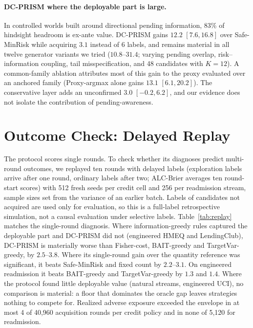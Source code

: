 \documentclass[runningheads]{llncs}
\begin{document}
\paragraph{DC-PRISM where the deployable part is large.} In controlled worlds built around directional pending information, 83\% of hindsight headroom is ex-ante value. DC-PRISM gains $12.2$ $[7.6,16.8]$ over Safe-MinRisk while acquiring $3.1$ instead of 6 labels, and remains material in all twelve generator variants we tried ($10.8$--$31.4$; varying pending overlap, risk--information coupling, tail misspecification, and 48 candidates with $K=12$). A common-family ablation attributes most of this gain to the proxy evaluated over an anchored family (Proxy-argmax alone gains $13.1$ $[6.1,20.2]$). The conservative layer adds an unconfirmed $3.0$ $[-0.2,6.2]$, and our evidence does not isolate the contribution of pending-awareness.

\section{Outcome Check: Delayed Replay}
\label{sec:replay}
The protocol scores single rounds. To check whether its diagnoses predict multi-round outcomes, we replayed ten rounds with delayed labels (exploration labels arrive after one round, ordinary labels after two; ALC-Brier averages ten round-start scores) with 512 fresh seeds per credit cell and 256 per readmission stream, sample sizes set from the variance of an earlier batch. Labels of candidates not acquired are used only for evaluation, so this is a full-label retrospective simulation, not a causal evaluation under selective labels. Table~\ref{tab:replay} matches the single-round diagnosis. Where information-greedy rules captured the deployable part and DC-PRISM did not (engineered HMEQ and LendingClub), DC-PRISM is materially worse than Fisher-cost, BAIT-greedy and TargetVar-greedy, by $2.5$--$3.8$. Where its single-round gain over the quantity reference was significant, it beats Safe-MinRisk and fixed count by $2.2$--$3.1$. On engineered readmission it beats BAIT-greedy and TargetVar-greedy by $1.3$ and $1.4$. Where the protocol found little deployable value (natural streams, engineered UCI), no comparison is material: a floor that dominates the oracle gap leaves strategies nothing to compete for. Realized adverse exposure exceeded the envelope in at most 4 of 40{,}960 acquisition rounds per credit policy and in none of 5{,}120 for readmission.
\end{document}
